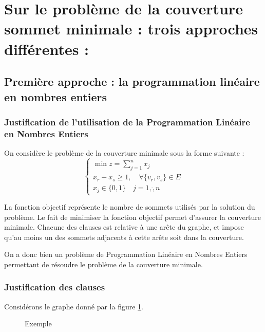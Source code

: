 \section{Sur le problème de la couverture sommet minimale : trois approches différentes :}

\subsection{Première approche : la programmation linéaire en nombres entiers}

\subsubsection{Justification de l'utilisation de la Programmation Linéaire en Nombres Entiers}

On considère le problème de la couverture minimale sous la forme suivante : $$
\left \lbrace \begin{array}{l}
	\min z = \sum_{j=1}^n x_j\\
	x_r + x_s \geq 1, \quad \forall \{v_r, v_s\} \in E \\
	x_j \in \{0,1\} \quad j = 1, \dot, n
\end{array} \right .
$$

La fonction objectif représente le nombre de sommets utilisés par la solution du problème. Le fait
de minimiser la fonction objectif permet d'assurer la couverture minimale. Chacune des clauses est
relative à une arête du graphe, et impose qu'au moins un des sommets adjacents à cette arête soit
dans la couverture.

On a donc bien un problème de Programmation Linéaire en Nombres Entiers permettant de résoudre le problème de la couverture minimale.

\subsubsection{Justification des clauses}

Considérons le graphe donné par la figure \ref{triangle}. 

\begin{figure}
	\begin{center}
	\end{center}
	\label{triangle}
	\caption{Exemple}
\end{figure}

